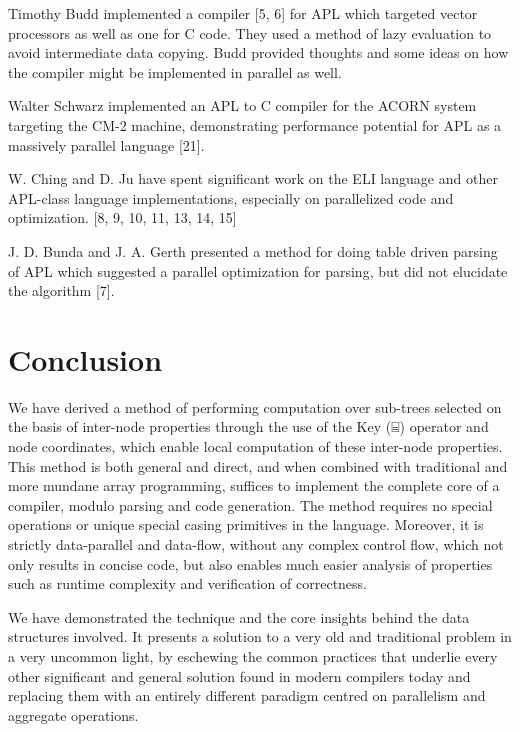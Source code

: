 \documentclass[numbers,preprint]{sigplanconf}
\begin{document}
Timothy Budd implemented a compiler [5, 6] for APL which targeted vector processors as well as one 
for C code. They used a method of lazy evaluation to avoid intermediate data copying. Budd provided 
thoughts and some ideas on how the compiler might be implemented in parallel as well. 

Walter Schwarz implemented an APL to C compiler for the ACORN system targeting the CM-2 machine, 
demonstrating performance potential for APL as a massively parallel language [21].

W. Ching and D. Ju have spent significant work on the ELI language and other APL-class language
 implementations, especially on parallelized code and optimization. [8, 9, 10, 11, 13, 14, 15]

J. D. Bunda and J. A. Gerth presented a method for doing table driven parsing of APL which 
suggested a parallel optimization for parsing, but did not elucidate the algorithm [7].
\section{Conclusion}

We have derived a method of performing computation over sub-trees selected on the basis of 
inter-node properties through the use of the Key (⌸) operator and node coordinates, which enable 
local computation of these inter-node properties. This method is both general and direct, and when 
combined with traditional and more mundane array programming, suffices to implement the 
complete core of a compiler, modulo parsing and code generation. The method requires no special 
operations or unique special casing primitives in the language. Moreover, it is strictly data-parallel 
and data-flow, without any complex control flow, which not only results in concise code, but also 
enables much easier analysis of properties such as runtime complexity and verification of correctness. 

We have demonstrated the technique and the core insights behind the data structures involved. It 
presents a solution to a very old and traditional problem in a very uncommon light, by eschewing 
the common practices that underlie every other significant and general solution found in modern 
compilers today and replacing them with an entirely different paradigm centred on parallelism 
and aggregate operations.


\end{document}
